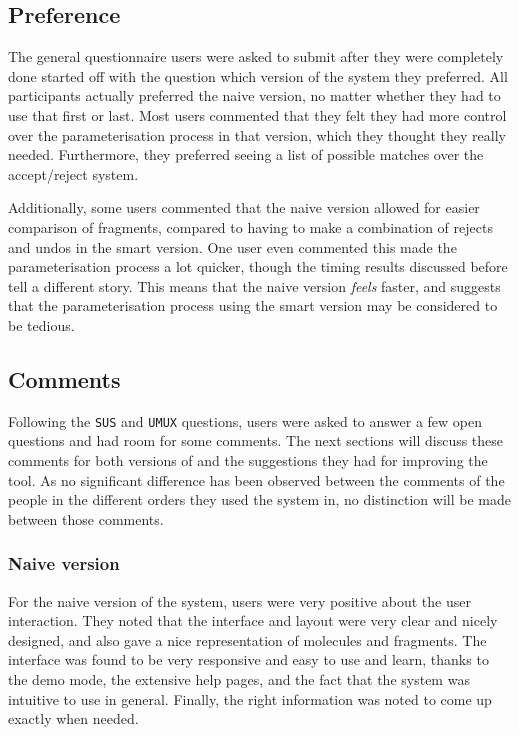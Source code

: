 \subsection{Preference}
The general questionnaire users were asked to submit after they were completely done started off with the question which version of the system they preferred. All participants actually preferred the naive version, no matter whether they had to use that first or last. Most users commented that they felt they had more control over the parameterisation process in that version, which they thought they really needed. Furthermore, they preferred seeing a list of possible matches over the accept/reject system.

Additionally, some users commented that the naive version allowed for easier comparison of fragments, compared to having to make a combination of rejects and undos in the smart version. One user even commented this made the parameterisation process a lot quicker, though the timing results discussed before tell a different story. This means that the naive version \emph{feels} faster, and suggests that the parameterisation process using the smart version may be considered to be tedious.

\subsection{Comments}
Following the \verb|SUS| and \verb|UMUX| questions, users were asked to answer a few open questions and had room for some comments. The next sections will discuss these comments for both versions of \oframp{} and the suggestions they had for improving the tool. As no significant difference has been observed between the comments of the people in the different orders they used the system in, no distinction will be made between those comments.

\subsubsection{Naive version}
For the naive version of the system, users were very positive about the user interaction. They noted that the interface and layout were very clear and nicely designed, and also gave a nice representation of molecules and fragments. The interface was found to be very responsive and easy to use and learn, thanks to the demo mode, the extensive help pages, and the fact that the system was intuitive to use in general. Finally, the right information was noted to come up exactly when needed.

